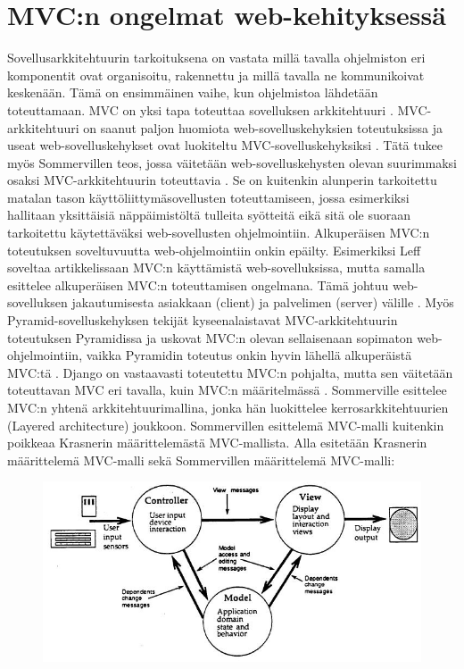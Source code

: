 \documentclass[utf8]{gradu3}
\begin{document}
\section{MVC:n ongelmat web-kehityksessä}
Sovellusarkkitehtuurin tarkoituksena on vastata millä tavalla ohjelmiston eri komponentit ovat organisoitu, rakennettu ja millä tavalla ne kommunikoivat keskenään. Tämä on ensimmäinen vaihe, kun ohjelmistoa lähdetään toteuttamaan. MVC on yksi tapa
toteuttaa sovelluksen arkkitehtuuri \parencite[s. 148]{Sommerville}. MVC-arkkitehtuuri on saanut paljon huomiota web-sovelluskehyksien
toteutuksissa ja useat web-sovelluskehykset ovat luokiteltu
MVC-sovelluskehyksiksi \parencite{mvcframeworks}. Tätä tukee myös Sommervillen teos, jossa väitetään web-sovelluskehysten olevan suurimmaksi osaksi MVC-arkkitehtuurin toteuttavia \parencite[s. 432]{Sommerville}.
Se on kuitenkin alunperin tarkoitettu matalan tason käyttöliittymäsovellusten toteuttamiseen,
jossa esimerkiksi hallitaan yksittäisiä näppäimistöltä tulleita
syötteitä eikä sitä ole suoraan tarkoitettu käytettäväksi
web-sovellusten ohjelmointiin. Alkuperäisen MVC:n toteutuksen
soveltuvuutta web-ohjelmointiin onkin epäilty. Esimerkiksi Leff
soveltaa artikkelissaan MVC:n käyttämistä web-sovelluksissa, mutta
samalla esittelee alkuperäisen MVC:n toteuttamisen ongelmana. Tämä johtuu web-sovelluksen jakautumisesta asiakkaan
(client) ja palvelimen (server) välille \parencite{ibm_watson}. Myös Pyramid-sovelluskehyksen tekijät
kyseenalaistavat MVC-arkkitehtuurin toteutuksen Pyramidissa ja uskovat
MVC:n olevan sellaisenaan sopimaton web-ohjelmointiin, vaikka
Pyramidin toteutus onkin hyvin lähellä alkuperäistä MVC:tä
\parencite{pyramid}. Django on vastaavasti toteutettu MVC:n pohjalta, mutta sen väitetään toteuttavan MVC eri tavalla, kuin MVC:n määritelmässä \parencite{django_mvc}.
Sommerville \parencite[s. 157]{Sommerville} esittelee MVC:n yhtenä arkkitehtuurimallina, jonka hän luokittelee
kerrosarkkitehtuurien (Layered architecture) joukkoon. Sommervillen esittelemä MVC-malli kuitenkin poikkeaa Krasnerin \parencite{krasner} määrittelemästä MVC-mallista. Alla esitetään Krasnerin määrittelemä MVC-malli sekä Sommervillen määrittelemä MVC-malli:




\begin{figure}[h]
\centering
\includegraphics[scale=0.5]{krasner_mvc.jpg}
\caption{\parencite[s. 5]{krasner_desc}}
\end{figure}
\end{document}
